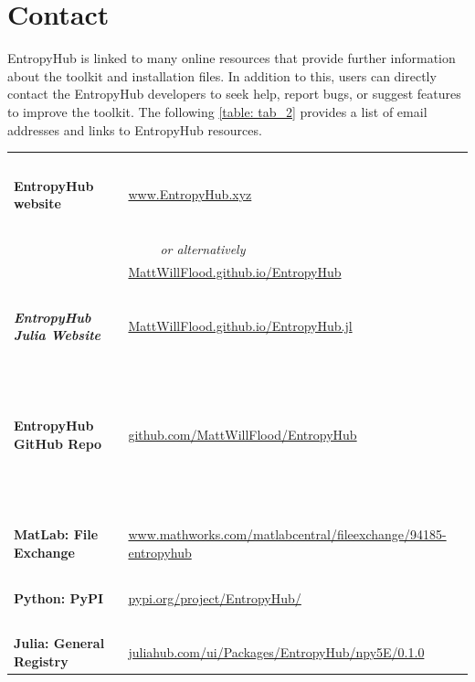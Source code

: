 \documentclass[12pt, a4paper, titlepage, openany]{book}
\begin{document}
\section{\textbf{Contact}}
EntropyHub is linked to many online resources that provide further information about the toolkit and installation files. In addition to this, users can directly contact the EntropyHub developers to seek help, report bugs, or suggest features to improve the toolkit.
The following \ref{table: tab_2} provides a list of email addresses and links to EntropyHub resources.
\begin{center}
\begin{table}[!ht]
\begin{tabular}{|p{6cm}|p{10cm}|}
\hline
\rowcolor{ehone} \multicolumn{2}{|c|}{\textbf{\textcolor{white}{Online Resources}}} \\
\hline
\ 					& \ \\	 
\textbf{EntropyHub website}	&	\href{https://www.EntropyHub.xyz}{www.EntropyHub.xyz}	\\
\ 					& \ \\	 
\ 					& \ \ \ \ \ \emph{or alternatively} \\
\ 					& \href{https://MattWillFlood.github.io/EntropyHub}{MattWillFlood.github.io/EntropyHub} \\
\ 					& \ \\	 
\textbf{\textit{EntropyHub Julia Website}} & \href{https://MattWillFlood.github.io/EntropyHub.jl}{MattWillFlood.github.io/EntropyHub.jl} \\
\ 					& \ \\	 
\ 					& \ \\	
\ 					& \ \\	
\textbf{EntropyHub GitHub Repo}	&	\href{https://github.com/MattWillFlood/EntropyHub}{github.com/MattWillFlood/EntropyHub}	\\
\ 					& \ \\	 
\ 					& \ \\	
\ 					& \ \\	
\textbf{MatLab: File Exchange}	&	\href{https://www.mathworks.com/matlabcentral/fileexchange/94185-entropyhub}{www.mathworks.com/matlabcentral/fileexchange/94185-entropyhub}	\\
\ 					& \ \\	 
\textbf{Python: PyPI }	&	\href{https://pypi.org/project/EntropyHub/}{pypi.org/project/EntropyHub/}	\\
\ 					& \ \\	 
\textbf{Julia: General Registry} & \href{https://juliahub.com/ui/Packages/EntropyHub/npy5E/}{juliahub.com/ui/Packages/EntropyHub/npy5E/0.1.0}	\\

\end{tabular}
\end{table}
\end{center}
\end{document}
